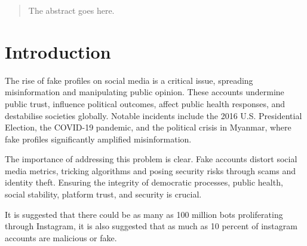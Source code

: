 \documentclass[conference]{IEEEtran}
\begin{document}

\graphicspath{{./figures}}



\maketitle

\begin{abstract}
	The abstract goes here.
\end{abstract}





%
\IEEEpeerreviewmaketitle



\section{Introduction}

The rise of fake profiles on social media is a critical issue, spreading misinformation and manipulating public opinion. These accounts undermine public trust, influence political outcomes, affect public health responses, and destabilise societies globally. Notable incidents include the 2016 U.S. Presidential Election, the COVID-19 pandemic, and the political crisis in Myanmar, where fake profiles significantly amplified misinformation\cite{ZoltanWeigand2023,AlharbiEtAl2022}.

The importance of addressing this problem is clear. Fake accounts distort social media metrics, tricking algorithms and posing security risks through scams and identity theft. Ensuring the integrity of democratic processes, public health, social stability, platform trust, and security is crucial.

It is suggested that there could be as many as 100 million bots proliferating through Instagram, it is also suggested that as much as 10 percent of instagram accounts are malicious or fake\cite{Williams2018}.
\end{document}
